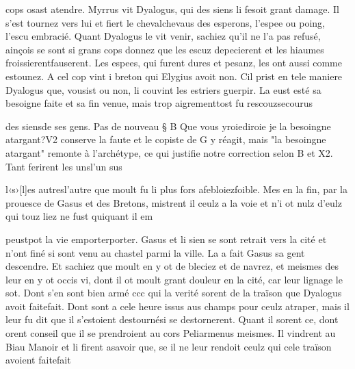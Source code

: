 \documentclass{article}
\begin{document}
\begin{pages}
                  cops osast atendre. Myrrus vit Dyalogus, qui des siens li fesoit grant damage. Il s’est
               tournez vers lui et fiert 
                  le chevalchevaus des esperons, l’espee ou poing, l’escu embracié. Quant Dyalogus le vit venir, sachiez qu’il ne l’a pas refusé,
               ainçois se sont si grans cops donnez que les escuz depecierent et les hiaumes 
                  froissierentfauserent. Les espees, qui furent dures et pesanz, les ont aussi comme estounez. A cel
               cop vint i
               breton qui Elygius avoit non. Cil prist en tele maniere Dyalogus que, vousist ou non, li couvint les estriers guerpir. La eust
               esté sa besoigne 
                  faite et sa fin venue, mais trop 
                  aigrementtost fu 
                  rescouzsecourus
               
                  des siensde ses gens. \pend
            \pstart Pas de nouveau § B
               Que vous 
                     yroiediroie je 
                     la besoingne atargant?V2 conserve la faute et le copiste de G y
                  réagit, mais "la besoingne atargant" remonte à l'archétype, ce qui justifie notre
                  correction selon B et X2. Tant ferirent 
                  les unsl'un sus 
                  
                        l‹s›[l]es autresl'autre que moult fu li plus fors 
                  afebloiezfoible. Mes en la fin, par la prouesce de Gasus et
               des Bretons, mistrent il ceulz a la voie et
               n’i ot nulz d’eulz qui touz liez ne fust 
                  quiquant il em 

                  peustpot la vie 
                  emporterporter. Gasus et li sien se sont retrait vers la cité et n’ont finé si sont venu au  chastel parmi la ville. La a
               fait Gasus sa gent descendre. Et sachiez que moult
               en y ot de bleciez et de navrez, et meismes des leur en y ot occis vi,
               dont il ot moult grant douleur en la cité, car leur lignage le sot. Dont
               s’en sont bien armé ccc qui la verité sorent de la traïson que Dyalogus avoit 
                  faitefait. Dont sont a cele heure issus aus champs pour ceulz atraper, mais il leur fu
               dit 
                  que il s’estoient destournési se destornerent. Quant il sorent ce, dont orent conseil que il se prendroient au cors
                  Peliarmenus meismes. Il vindrent au
                  Biau Manoir et li firent asavoir que, se
               il ne leur rendoit ceulz qui cele traïson avoient 
                  faitefait
               

\end{pages}
\end{document}
